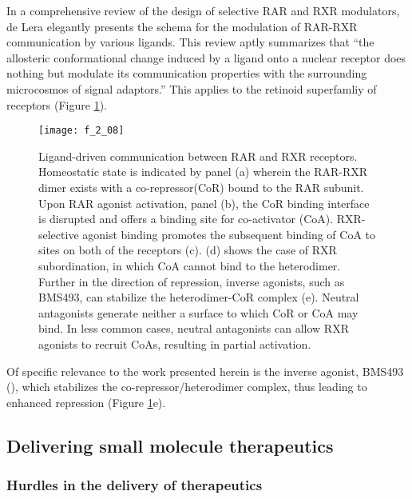 \begin{refsection}
In a comprehensive review of the design of selective RAR and RXR modulators, de
Lera elegantly presents the schema for the modulation of RAR-RXR
communication by various ligands. This review aptly summarizes that ``the
allosteric conformational change induced by a ligand onto a nuclear receptor
does nothing but modulate its communication properties with the surrounding
microcosmos of signal adaptors.''\cite{DeLera2007} This applies to the retinoid
superfamliy of receptors (Figure \ref{fig:RAR_communication}).
\begin{figure}[h!] \centering \texttt{[image: f\_2\_08]}
    \caption[Ligand-driven communication between RAR and RXR
    receptors.]{Ligand-driven communication between RAR and RXR receptors.
        Homeostatic state is indicated by panel (a) wherein the RAR-RXR dimer
        exists with a co-repressor(CoR) bound to the RAR subunit. Upon RAR
        agonist activation, panel (b), the CoR binding interface is disrupted
        and offers a binding site for co-activator (CoA). RXR-selective agonist
        binding promotes the subsequent binding of CoA to sites on both of the
        receptors (c). (d) shows the case of RXR subordination, in which CoA
        cannot bind to the heterodimer. Further in the direction of repression,
        inverse agonists, such as BMS493, can stabilize the heterodimer-CoR
        complex (e). Neutral antagonists generate neither a surface to which CoR or
        CoA may bind. In less common cases, neutral antagonists can allow RXR
        agonists to recruit CoAs, resulting in partial activation.\cite{DeLera2007}}\label{fig:RAR_communication} \end{figure}
Of specific relevance to the work presented herein is the inverse agonist,
BMS493 (), which
stabilizes the co-repressor/heterodimer complex, thus leading to enhanced
repression (Figure \ref{fig:RAR_communication}e).\cite{Germain2002} 

\subsection{Delivering small molecule therapeutics}

\subsubsection{Hurdles in the delivery of therapeutics}


\end{refsection}
